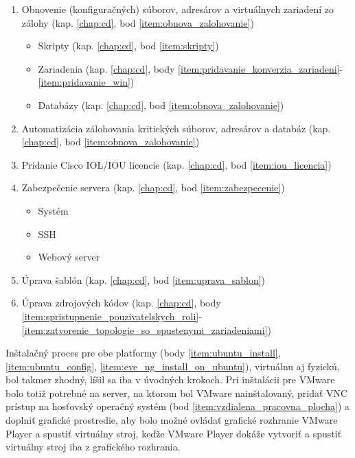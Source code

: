 \begin{enumerate}[noitemsep]
    \item \label{item:obnovenie_suborov} Obnovenie (konfiguračných) súborov, adresárov a virtuálnych zariadení zo zálohy (kap. \ref{chap:cd}, bod \ref{item:obnova_zalohovanie})
    \begin{itemize}[noitemsep]
        \item Skripty (kap. \ref{chap:cd}, bod \ref{item:skripty})
        \item Zariadenia (kap. \ref{chap:cd}, body \ref{item:pridavanie_konverzia_zariadeni}-\ref{item:pridavanie_win})
        \item Databázy (kap. \ref{chap:cd}, bod \ref{item:obnova_zalohovanie})
    \end{itemize}
    \item \label{item:automatizacia_zalohovania} Automatizácia zálohovania kritických súborov, adresárov a databáz (kap. \ref{chap:cd}, bod \ref{item:obnova_zalohovanie})
    \item \label{item:iol_license_generate} Pridanie Cisco IOL/IOU licencie (kap. \ref{chap:cd}, bod \ref{item:iou_licencia})
    \item \label{item:zabezpecenie_servera} Zabezpečenie servera (kap. \ref{chap:cd}, bod \ref{item:zabezpecenie})
    \begin{itemize}[noitemsep]
        \item Systém
        \item SSH
        \item Webový server
    \end{itemize}
    \item \label{item:uprava_sablon_zariadeni} Úprava šablón (kap. \ref{chap:cd}, bod \ref{item:uprava_sablon})
    \item \label{item:uprava_zdrojovych_kodov} Úprava zdrojových kódov (kap. \ref{chap:cd}, body \ref{item:spristupnenie_pouzivatelskych_roli}-\ref{item:zatvorenie_topologie_so_spustenymi_zariadeniami})
\end{enumerate}

Inštalačný proces pre obe platformy (body \ref{item:ubuntu_install}, \ref{item:ubuntu_config}, \ref{item:eve_ng_install_on_ubuntu}), virtuálnu aj fyzickú, bol takmer zhodný, líšil sa iba v úvodných krokoch. Pri inštalácii pre VMware bolo totiž potrebné na server, na ktorom bol VMware nainštalovaný, pridať VNC prístup na hosťovský operačný systém (bod \ref{item:vzdialena_pracovna_plocha}) a doplniť grafické prostredie, aby bolo možné ovládať grafické rozhranie VMware Player a spustiť virtuálny stroj, keďže VMware Player dokáže vytvoriť a spustiť virtuálny stroj iba z grafického rozhrania.

